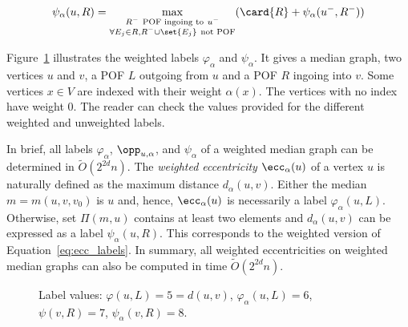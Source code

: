 \[
\psi_{\alpha}(u,R) = \max\limits_{\substack{R^- ~\mbox{\scriptsize{POF ingoing to}}~ u^- \\ \forall E_j \in R, R^- \cup \set{E_j} ~\mbox{\scriptsize{not POF}}}} (\card{R} + \psi_{\alpha}(u^-,R^-))
\]

Figure~\ref{fig:weights} illustrates the weighted labels $\varphi_{\alpha}$ and $\psi_{\alpha}$. It gives a median graph, two vertices $u$ and $v$, a POF $L$ outgoing from $u$ and a POF $R$ ingoing into $v$. Some vertices $x \in V$ are indexed with their weight $\alpha(x)$. The vertices with no index have weight 0. The reader can check the values provided for the different weighted and unweighted labels.

In brief, all labels $\varphi_{\alpha}$, $\opp_{u,\alpha}$, and $\psi_{\alpha}$ of a weighted median graph can be determined in $\tilde{O}(2^{2d}n)$. The \textit{weighted eccentricity} $\ecc_{\alpha}(u)$ of a vertex $u$ is naturally defined as the maximum distance $d_{\alpha}(u,v)$. Either the median $m = m(u,v,v_0)$ is $u$ and, hence, $\ecc_{\alpha}(u)$ is necessarily a label $\varphi_{\alpha}(u,L)$. Otherwise, set $\Pi(m,u)$ contains at least two elements and $d_{\alpha}(u,v)$ can be expressed as a label $\psi_{\alpha}(u,R)$. This corresponds to the weighted version of Equation~\eqref{eq:ecc_labels}. In summary, all weighted eccentricities on weighted median graphs can also be computed in time $\tilde{O}(2^{2d}n)$.

\begin{figure}[t]
\centering
\scalebox{0.9}{}
\caption{Label values: $\varphi(u,L) = 5 =d(u,v)$, $\varphi_{\alpha}(u,L) = 6$, $\psi(v,R) = 7$, $\psi_{\alpha}(v,R)= 8$.}
\label{fig:weights}
\end{figure}